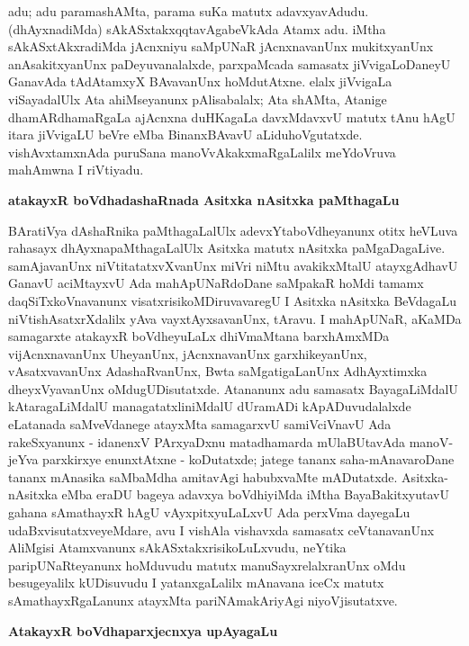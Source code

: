 adu; adu paramashAMta, parama suKa matutx adavxyavAdudu. (dhAyxnadiMda) sAkASxtakxqqtavAgabeVkAda Atamx adu. iMtha sAkASxtAkxradiMda jAcnxniyu saMpUNaR jAcnxnavanUnx mukitxyanUnx anAsakitxyanUnx paDeyuvanalalxde, parxpaMcada samasatx jiVvigaLoDaneyU GanavAda tAdAtamxyX BAvavanUnx hoMdutAtxne. elalx jiVvigaLa viSayadalUlx Ata ahiMseyanunx pAlisabalalx; Ata shAMta, Atanige dhamARdhamaRgaLa ajAcnxna duHKagaLa davxMdavxvU matutx tAnu hAgU itara jiVvigaLU beVre eMba BinanxBAvavU aLiduhoVgutatxde. vishAvxtamxnAda puruSana manoVvAkakxmaRgaLalilx meYdoVruva mahAmwna I riVtiyadu.

\smallskip
\begin{center}
{\Large\bf atakayxR boVdhadashaRnada Asitxka nAsitxka paMthagaLu}
\end{center}

BAratiVya dAshaRnika paMthagaLalUlx adevxYtaboVdheyanunx otitx heVLuva rahasayx dhAyxnapaMthagaLalUlx Asitxka matutx nAsitxka paMgaDagaLive. samAjavanUnx niVtitatatxvXvanUnx miVri niMtu avakikxMtalU atayxgAdhavU GanavU aciMtayxvU Ada mahApUNaR\-doDane saMpakaR hoMdi tamamx daqSiTxkoVnavanunx visatxrisikoMDiruvavaregU I Asitxka nAsitxka BeVdagaLu niVtishAsatxrXdalilx yAva vayxtAyxsavanUnx, tAravu. I mahApUNaR, aKaMDa samagarxte atakayxR boVdheyuLaLx dhiVmaMtana barxhAmxMDa vijAcnxnavanUnx UheyanUnx, jAcnxnavanUnx garxhikeyanUnx, vAsatxvavanUnx AdashaRvanUnx, Bwta saMgatigaLanUnx AdhAyxtimxka dheyxVyavanUnx oMdugUDisutatxde. Atananunx adu samasatx BayagaLiMdalU kAtaragaLiMdalU managatatxliniMdalU dUramADi kApADuvudalalxde eLatanada saMveVdanege atayxMta samagarxvU samiVciVnavU Ada rakeSxyanunx - idanenxV PArxyaDxnu matadhamarda mUlaBUtavAda manoV-jeYva parxkirxye enunxtAtxne - koDutatxde; jatege tananx saha-mAnavaroDane tananx mAnasika saMbaMdha amitavAgi habubxvaMte mADutatxde. Asitxka-nAsitxka eMba eraDU bageya adavxya boVdhiyiMda iMtha BayaBakitxyutavU gahana sAmathayxR hAgU vAyxpitxyuLaLxvU Ada perxVma dayegaLu udaBxvisutatxveyeMdare, avu I vishAla vishavxda samasatx ceVtanavanUnx AliMgisi Atamxvanunx sAkASxtakxrisikoLuLxvudu, neYtika paripUNaRteyanunx hoMduvudu matutx manuSayxrelalxranUnx oMdu besugeyalilx kUDisuvudu I yatanxgaLalilx mAnavana iceCx matutx sAmathayxRgaLanunx atayxMta pariNAmakAriyAgi niyoVjisutatxve.

\smallskip
\begin{center}
{\Large\bf AtakayxR boVdhaparxjecnxya upAyagaLu}
\end{center}

